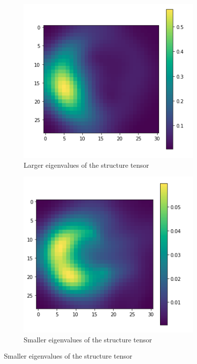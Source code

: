 		\begin{figure}
		
			\begin{subfigure}[t]{.55\textwidth}
				\includegraphics[scale=0.5]{images/larger_ev.png}
				\caption{Larger eigenvalues of the structure tensor}		
				\label{subfig:larger_ev}
			\end{subfigure}
			\begin{subfigure}[t]{.55\textwidth}
				\includegraphics[scale=0.5]{images/smaller_ev.png}
				\caption{Smaller eigenvalues of the structure tensor }
				\label{subfig:smaller_ev}
			\end{subfigure}
			

\end{figure}
